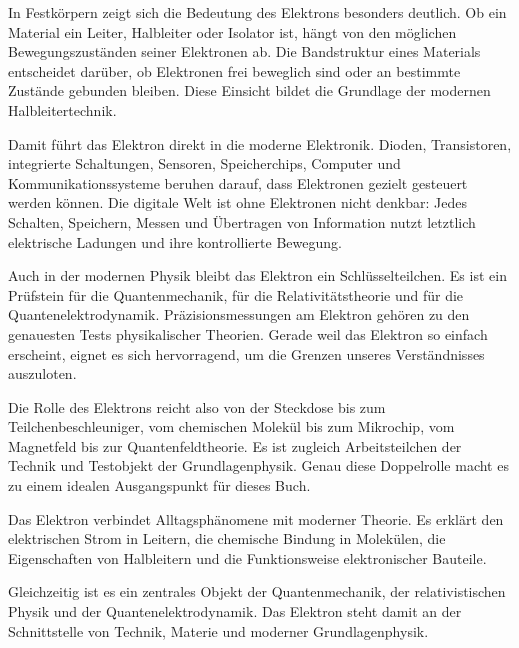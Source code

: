 In Festkörpern zeigt sich die Bedeutung des Elektrons besonders
deutlich. Ob ein Material ein Leiter, Halbleiter oder
Isolator ist, hängt von den möglichen Bewegungszuständen seiner
Elektronen ab. Die Bandstruktur eines Materials entscheidet darüber,
ob Elektronen frei beweglich sind oder an bestimmte Zustände gebunden bleiben. Diese
Einsicht bildet die Grundlage der modernen Halbleitertechnik.

Damit führt das Elektron direkt in die moderne Elektronik. Dioden,
Transistoren, integrierte Schaltungen,
Sensoren, Speicherchips, Computer
und Kommunikationssysteme beruhen darauf, dass Elektronen gezielt gesteuert werden
können. Die digitale Welt ist ohne Elektronen nicht denkbar: Jedes Schalten, Speichern,
Messen und Übertragen von Information nutzt letztlich elektrische Ladungen und ihre
kontrollierte Bewegung.

Auch in der modernen Physik bleibt das Elektron ein Schlüsselteilchen. Es ist ein
Prüfstein für die Quantenmechanik, für die Relativitätstheorie
und für die Quantenelektrodynamik. Präzisionsmessungen
am Elektron gehören zu den genauesten Tests physikalischer Theorien. Gerade weil das
Elektron so einfach erscheint, eignet es sich hervorragend, um die Grenzen unseres
Verständnisses auszuloten.

Die Rolle des Elektrons reicht also von der Steckdose bis zum Teilchenbeschleuniger,
vom chemischen Molekül bis zum Mikrochip, vom Magnetfeld bis zur Quantenfeldtheorie.
Es ist zugleich Arbeitsteilchen der Technik und Testobjekt der Grundlagenphysik.
Genau diese Doppelrolle macht es zu einem idealen Ausgangspunkt für dieses Buch.

\begin{PhysicsBox}
	\label{box:vomAlltag}
	Das Elektron verbindet Alltagsphänomene mit moderner Theorie. Es erklärt den
	elektrischen Strom in Leitern, die chemische Bindung in Molekülen, die Eigenschaften
	von Halbleitern und die Funktionsweise elektronischer Bauteile.
	
	Gleichzeitig ist es ein zentrales Objekt der Quantenmechanik, der relativistischen
	Physik und der Quantenelektrodynamik. Das Elektron steht damit an der Schnittstelle
	von Technik, Materie und moderner Grundlagenphysik.
\end{PhysicsBox}